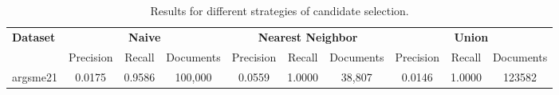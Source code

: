 \begin{sidewaystable}
    \centering
    \caption{Results for different strategies of candidate selection.}
    \begin{tabular}{lccccccccc}
        \toprule
        \textbf{Dataset} & \multicolumn{3}{c}{\textbf{Naive}} & \multicolumn{3}{c}{\textbf{Nearest Neighbor}} & \multicolumn{3}{c}{\textbf{Union}} \\
        \cmidrule(lr){2-4} \cmidrule(lr){5-7} \cmidrule(lr){8-10}
                         & Precision & Recall & Documents & Precision & Recall & Documents & Precision & Recall & Documents \\
        \midrule

        argsme21 & 0.0175 & 0.9586 & 100,000 & 0.0559 & 1.0000 & 38,807 & 0.0146 & 1.0000 & 123582 \\

        \bottomrule 
    \end{tabular}
\end{sidewaystable}